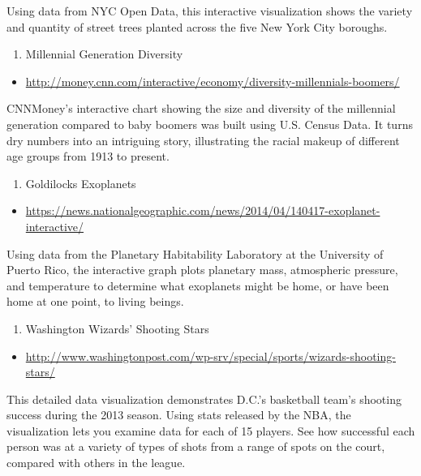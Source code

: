 \documentclass[]{book}
\providecommand{\tightlist}{%
  \setlength{\itemsep}{0pt}\setlength{\parskip}{0pt}}
\theoremstyle{definition}
\theoremstyle{definition}
\theoremstyle{definition}
\theoremstyle{remark}
\begin{document}
Using data from NYC Open Data, this interactive visualization shows the
variety and quantity of street trees planted across the five New York
City boroughs.

\begin{enumerate}
\def\labelenumi{\arabic{enumi}.}
\setcounter{enumi}{8}
\tightlist
\item
  Millennial Generation Diversity
\end{enumerate}

\begin{itemize}
\tightlist
\item
  \url{http://money.cnn.com/interactive/economy/diversity-millennials-boomers/}
\end{itemize}

CNNMoney's interactive chart showing the size and diversity of the
millennial generation compared to baby boomers was built using U.S.
Census Data. It turns dry numbers into an intriguing story, illustrating
the racial makeup of different age groups from 1913 to present.

\begin{enumerate}
\def\labelenumi{\arabic{enumi}.}
\setcounter{enumi}{9}
\tightlist
\item
  Goldilocks Exoplanets
\end{enumerate}

\begin{itemize}
\tightlist
\item
  \url{https://news.nationalgeographic.com/news/2014/04/140417-exoplanet-interactive/}
\end{itemize}

Using data from the Planetary Habitability Laboratory at the University
of Puerto Rico, the interactive graph plots planetary mass, atmospheric
pressure, and temperature to determine what exoplanets might be home, or
have been home at one point, to living beings.

\begin{enumerate}
\def\labelenumi{\arabic{enumi}.}
\setcounter{enumi}{10}
\tightlist
\item
  Washington Wizards' Shooting Stars
\end{enumerate}

\begin{itemize}
\tightlist
\item
  \url{http://www.washingtonpost.com/wp-srv/special/sports/wizards-shooting-stars/}
\end{itemize}

This detailed data visualization demonstrates D.C.'s basketball team's
shooting success during the 2013 season. Using stats released by the
NBA, the visualization lets you examine data for each of 15 players. See
how successful each person was at a variety of types of shots from a
range of spots on the court, compared with others in the league.
\end{document}

